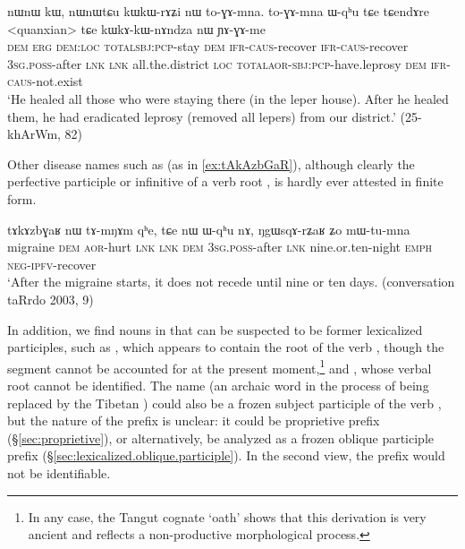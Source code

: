 \begin{exe}
\ex \label{ex:kWkAkWnAndza}
 \gll nɯnɯ kɯ, nɯnɯtɕu kɯ\redp{}kɯ-rɤʑi nɯ to-ɣɤ-mna. to-ɣɤ-mna ɯ-qʰu tɕe tɕendɤre <quanxian> tɕe kɯ\redp{}kɤ-kɯ-nɤndza nɯ ɲɤ-ɣɤ-me \\
 \textsc{dem} \textsc{erg} \textsc{dem}:\textsc{loc} \textsc{total}\redp{}\textsc{sbj}:\textsc{pcp}-stay \textsc{dem} \textsc{ifr}-\textsc{caus}-recover  \textsc{ifr}-\textsc{caus}-recover  \textsc{3sg}.\textsc{poss}-after \textsc{lnk} \textsc{lnk} all.the.district \textsc{loc} \textsc{total}\redp{}\textsc{aor}-\textsc{sbj}:\textsc{pcp}-have.leprosy \textsc{dem} \textsc{ifr}-\textsc{caus}-not.exist \\
\glt `He healed all those who were staying there (in the leper house). After he healed them, he had eradicated leprosy (removed all lepers) from our district.' (25-khArWm, 82)
\end{exe}

Other disease names such as  (as in \ref{ex:tAkAzbGaR}), although clearly the perfective participle or infinitive of a verb root , is hardly ever attested in finite form.

\begin{exe}
\ex \label{ex:tAkAzbGaR}
 \gll tɤkɤzbɣaʁ nɯ tɤ-mŋɤm qʰe, tɕe nɯ ɯ-qʰu nɤ, ŋgɯsqɤ-rʑaʁ ʑo mɯ-tu-mna \\
 migraine \textsc{dem} \textsc{aor}-hurt \textsc{lnk} \textsc{lnk} \textsc{dem} \textsc{3sg}.\textsc{poss}-after \textsc{lnk} nine.or.ten-night \textsc{emph} \textsc{neg}-\textsc{ipfv}-recover \\
\glt `After the migraine starts, it does not recede until nine or ten days. (conversation taRrdo 2003, 9)
\end{exe}

In addition, we find nouns in  that can be suspected to be former lexicalized participles, such as , which appears to contain the root of the verb   , though the segment  cannot be accounted for at the present moment,\footnote{In any case, the Tangut cognate   `oath' shows that this derivation is very ancient and reflects a non-productive morphological process. } and , whose verbal root cannot be identified. The name  (an archaic word in the process of being replaced by the Tibetan ) could also be a frozen subject participle  of the verb , but the nature of the prefix  is unclear: it could be proprietive prefix (§\ref{sec:proprietive}), or alternatively, be analyzed as a frozen oblique participle prefix (§\ref{sec:lexicalized.oblique.participle}). In the second view, the prefix  would not be identifiable.

